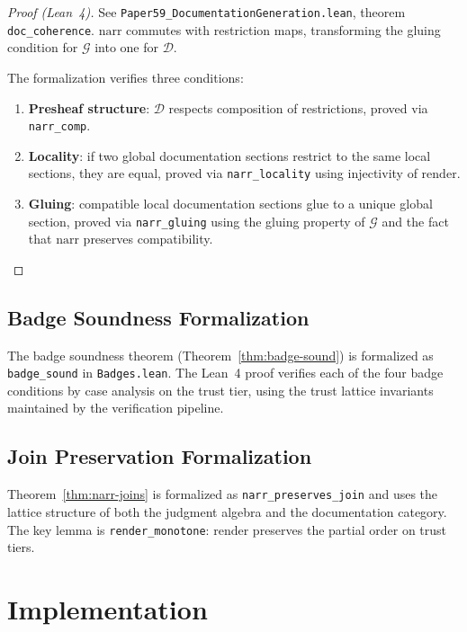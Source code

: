 \documentclass[11pt]{article}
\newcommand{\DocSheaf}{\mathcal{D}}
\newcommand{\NarrFunc}{\mathrm{narr}}
\newcommand{\RenderFunc}{\mathrm{render}}
\begin{document}
\begin{proof}[Proof (Lean~4)]
See \texttt{Paper59\_DocumentationGeneration.lean}, theorem
\texttt{doc\_coherence}.  $\NarrFunc$ commutes with restriction maps,
transforming the gluing condition for $\mathcal{G}$ into one for
$\DocSheaf$.

The formalization verifies three conditions:
\begin{enumerate}[noitemsep]
\item \textbf{Presheaf structure}: $\DocSheaf$ respects composition of
  restrictions, proved via \texttt{narr\_comp}.
\item \textbf{Locality}: if two global documentation sections restrict
  to the same local sections, they are equal, proved via
  \texttt{narr\_locality} using injectivity of $\RenderFunc$.
\item \textbf{Gluing}: compatible local documentation sections glue
  to a unique global section, proved via \texttt{narr\_gluing} using
  the gluing property of $\mathcal{G}$ and the fact that $\NarrFunc$
  preserves compatibility.
\end{enumerate}
\end{proof}

\subsection{Badge Soundness Formalization}
The badge soundness theorem (Theorem~\ref{thm:badge-sound}) is
formalized as \texttt{badge\_sound} in \texttt{Badges.lean}.  The
Lean~4 proof verifies each of the four badge conditions by case
analysis on the trust tier, using the trust lattice invariants
maintained by the verification pipeline.

\subsection{Join Preservation Formalization}
Theorem~\ref{thm:narr-joins} is formalized as
\texttt{narr\_preserves\_join} and uses the lattice structure of
both the judgment algebra and the documentation category.  The key
lemma is \texttt{render\_monotone}: $\RenderFunc$ preserves the
partial order on trust tiers.

\section{Implementation}\label{sec:implementation}
\end{document}
